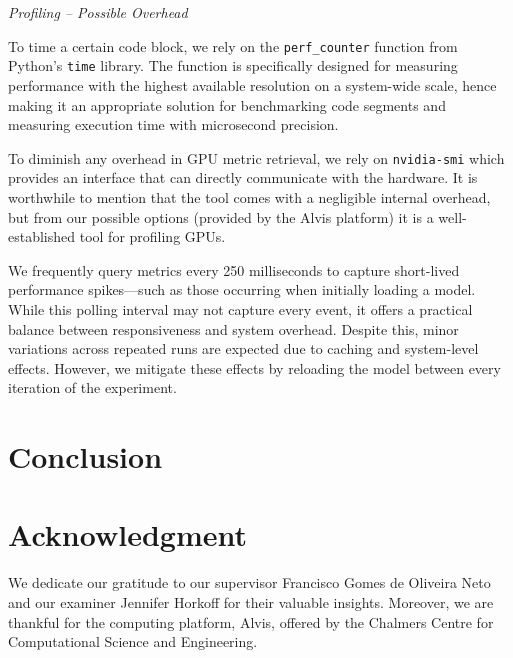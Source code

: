 \documentclass[conference]{IEEEtran}
\begin{document}
\textit{Profiling -- Possible Overhead}

To time a certain code block, we rely on the \verb|perf_counter| function from Python's \verb|time| library. The function is specifically designed for measuring performance with the highest available resolution on a system-wide scale, hence making it an appropriate solution for benchmarking code segments and measuring execution time with microsecond precision.

To diminish any overhead in GPU metric retrieval, we rely on \verb|nvidia-smi| which provides an interface that can directly communicate with the hardware. It is worthwhile to mention that the tool comes with a negligible internal overhead, but from our possible options (provided by the Alvis platform) it is a well-established tool for profiling GPUs. 

We frequently query metrics every 250 milliseconds to capture short-lived performance spikes—such as those occurring when initially loading a model. While this polling interval may not capture every event, it offers a practical balance between responsiveness and system overhead. Despite this, minor variations across repeated runs are expected due to caching and system-level effects. However, we mitigate these effects by reloading the model between every iteration of the experiment. 

\section*{Conclusion}


\section*{Acknowledgment}
We dedicate our gratitude to our supervisor Francisco Gomes de Oliveira Neto and our examiner Jennifer Horkoff for their valuable insights. Moreover, we are thankful for the computing platform, Alvis, offered by the Chalmers Centre for Computational Science and Engineering.


%
%
\end{document}
